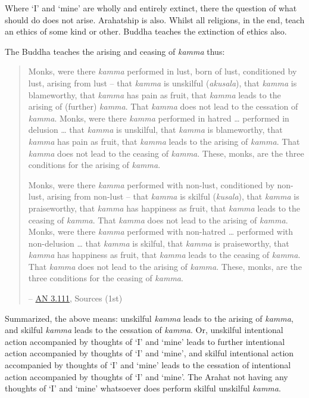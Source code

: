 Where `I' and `mine' are wholly and entirely extinct, there the question of what should  do does not arise. Arahatship is  also. Whilst all religions, in the end, teach an ethics of some kind or other. Buddha teaches the extinction of  ethics also.

The Buddha teaches the arising and ceasing of \emph{kamma} thus:

\begin{quote}
Monks, were there \emph{kamma} performed in lust, born of lust, conditioned by lust, arising from lust -- that \emph{kamma} is unskilful (\emph{akusala}), that \emph{kamma} is blameworthy, that \emph{kamma} has pain as fruit, that \emph{kamma} leads to the arising of (further) \emph{kamma}. That \emph{kamma} does not lead to the cessation of \emph{kamma}. Monks, were there \emph{kamma} performed in hatred \ldots{} performed in delusion \ldots{} that \emph{kamma} is unskilful, that \emph{kamma} is blameworthy, that \emph{kamma} has pain as fruit, that \emph{kamma} leads to the arising of \emph{kamma}. That \emph{kamma} does not lead to the ceasing of \emph{kamma}. These, monks, are the three conditions for the arising of \emph{kamma}.

Monks, were there \emph{kamma} performed with non-lust, conditioned by non-lust, arising from non-lust -- that \emph{kamma} is skilful (\emph{kusala}), that \emph{kamma} is praiseworthy, that \emph{kamma} has happiness as fruit, that \emph{kamma} leads to the ceasing of \emph{kamma}. That \emph{kamma} does not lead to the arising of \emph{kamma}. Monks, were there \emph{kamma} performed with non-hatred \ldots{} performed with non-delusion \ldots{} that \emph{kamma} is skilful, that \emph{kamma} is praiseworthy, that \emph{kamma} has happiness as fruit, that \emph{kamma} leads to the ceasing of \emph{kamma}. That \emph{kamma} does not lead to the arising of \emph{kamma}. These, monks, are the three conditions for the ceasing of \emph{kamma}.

 -- \href{https://suttacentral.net/an3.111/en/sujato}{AN 3.111}, Sources (1st)
\end{quote}

Summarized, the above means: unskilful \emph{kamma} leads to the arising of \emph{kamma}, and skilful \emph{kamma} leads to the cessation of \emph{kamma}. Or, unskilful intentional action accompanied by thoughts of `I' and `mine' leads to further intentional action accompanied by thoughts of `I' and `mine', and skilful intentional action accompanied by thoughts of `I' and `mine' leads to the cessation of intentional action accompanied by thoughts of `I' and `mine'. The Arahat not having any thoughts of `I' and `mine' whatsoever does  perform  skilful  unskilful \emph{kamma}.

